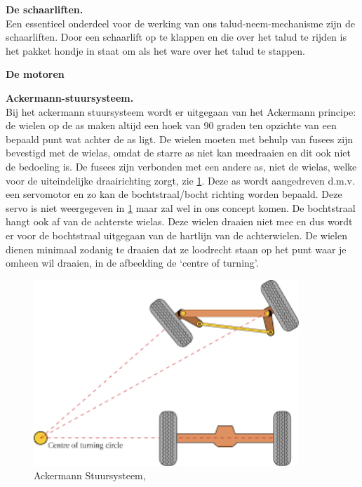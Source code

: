 \textbf{De schaarliften.}\\
Een essentieel onderdeel voor de werking van ons talud-neem-mechanisme zijn de schaarliften. Door een schaarlift op te klappen en die over het talud te rijden is het pakket hondje in staat om als het ware over het talud te stappen.\\
\vspace{\baselineskip}

\textbf{De motoren}

\textbf{Ackermann-stuursysteem.}\\
Bij het ackermann stuursysteem wordt er uitgegaan van het Ackermann principe: de wielen op de as maken altijd een hoek van 90 graden ten opzichte van een bepaald punt wat achter de as ligt. De wielen moeten met behulp van fusees zijn bevestigd met de wielas, omdat de starre as niet kan meedraaien en dit ook niet de bedoeling is. De fusees zijn verbonden met een andere as, niet de wielas, welke voor de uiteindelijke draairichting zorgt, zie \cref{fig: ackermann_FBD}. Deze as wordt aangedreven d.m.v. een servomotor en zo kan de bochtstraal/bocht richting worden bepaald. Deze servo is niet weergegeven in \cref{fig: ackermann_FBD} maar zal wel in ons concept komen. De bochtstraal hangt ook af van de achterste wielas. Deze wielen draaien niet mee en dus wordt er voor de bochtstraal uitgegaan van de hartlijn van de achterwielen. De wielen dienen minimaal zodanig te draaien dat ze loodrecht staan op het punt waar je omheen wil draaien, in de afbeelding de ‘centre of turning’.\\

\begin{figure}[H]
    \includegraphics[width = 100mm]{04_conceptdimensionering/ackermann.png}
    \caption{Ackermann Stuursysteem, }
    \label{fig: ackermann_FBD}
\end{figure}

